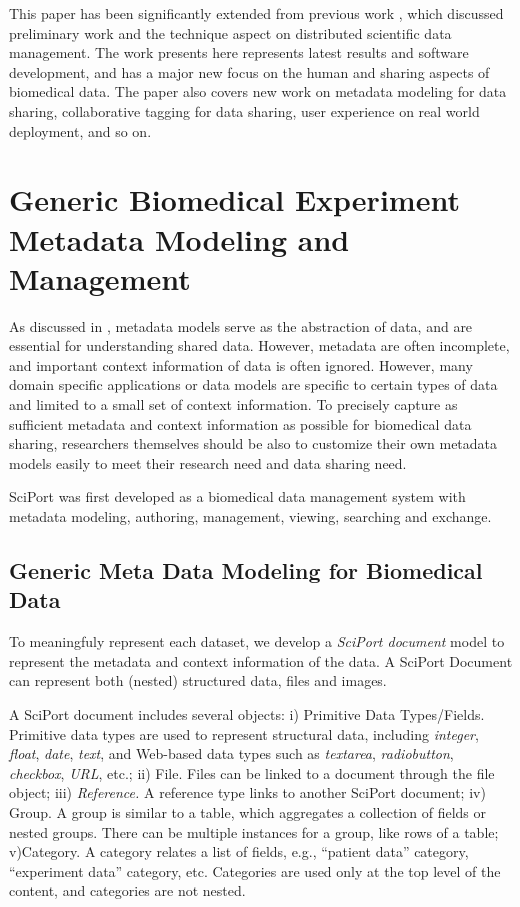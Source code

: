 \documentclass{doublecol-new}
\theoremstyle{TH}{
\newtheorem{lemma}{Lemma}
\newtheorem{theorem}[lemma]{Theorem}
\newtheorem{corrolary}[lemma]{Corrolary}
\newtheorem{conjecture}[lemma]{Conjecture}
\newtheorem{proposition}[lemma]{Proposition}
\newtheorem{claim}[lemma]{Claim}
\newtheorem{stheorem}[lemma]{Wrong Theorem}
\newtheorem{algorithm}{Algorithm}
}
\theoremstyle{THrm}{
\newtheorem{definition}{Definition}[section]
\newtheorem{question}{Question}[section]
\newtheorem{remark}{Remark}
\newtheorem{scheme}{Scheme}
}
\theoremstyle{THhit}{
\newtheorem{case}{Case}[section]
}
\begin{document}
This paper has been significantly extended from previous work
\cite{wang08com}, which discussed preliminary work and the technique
aspect on distributed scientific data management. The work presents
here represents latest results and software development, and has a
major new focus on the human and sharing aspects of biomedical data.
The paper also covers new work on metadata modeling for data
sharing, collaborative tagging for data sharing, user experience on
real world deployment, and so on.



\section{Generic Biomedical Experiment Metadata Modeling and Management} \label{sec:datamanagementoverview}


As discussed in \cite{birnholtz03data}, metadata models serve as the
abstraction of data, and are essential for understanding shared
data. However, metadata  are often incomplete, and important context
information of data \cite{chin04context} is often ignored. However,
many domain specific applications or data models are specific to
certain types of data and limited to a small set of context
information.  To precisely capture as sufficient metadata and
context information as possible for biomedical data sharing,
researchers themselves should be also to customize their own
metadata models easily to meet their research need and data sharing
need.


SciPort was first developed as a biomedical data management system  with
metadata  modeling, authoring, management, viewing, searching and
exchange.


\subsection{Generic Meta Data Modeling for Biomedical Data}

To meaningfuly represent each dataset, we develop a {\em SciPort document} model to represent the metadata and context information of the data.
A SciPort Document can represent both (nested) structured data, files and images.

A SciPort document includes several objects: i) Primitive Data
Types/Fields. Primitive data types are used to represent structural
data, including {\em integer}, {\em float}, {\em date}, {\em text},
and Web-based data types such as {\em textarea}, {\em radiobutton},
{\em checkbox}, {\em URL}, etc.; ii) File. Files can be linked to a
document through the file object; iii) \textit{Reference.}  A
reference type links to another SciPort document; iv) Group. A group
is similar to a table, which aggregates a collection of fields or
nested groups.  There can be multiple instances for a group, like
rows of a table; v)Category. A category relates a list of fields,
e.g., ``patient data'' category, ``experiment data'' category, etc.
Categories are used only at the top level of the content, and
categories are not nested.
\end{document}
